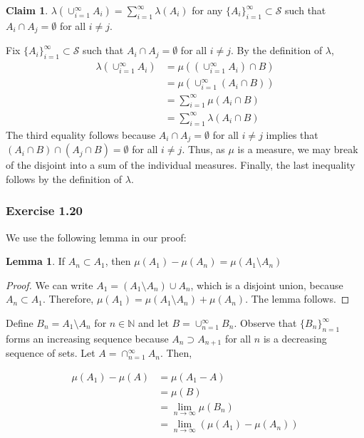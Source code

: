 \documentclass[letterpaper,12pt]{article}
\theoremstyle{definition}
\newtheorem{claim}[theorem]{Claim}
\newtheorem{lemma}[theorem]{Lemma}
\begin{document}
\begin{claim}
  $\lambda(\cup_{i=1}^{\infty} A_i) = \sum_{i = 1}^{\infty} \lambda(A_i)$ for any $\{A_i\}_{i=1}^{\infty} \subset \mathcal{S}$ such that $A_i \cap A_j = \emptyset$ for all $i \ne j$.
\end{claim}

Fix $\{A_i\}_{i=1}^{\infty} \subset \mathcal{S}$ such that $A_i \cap A_j = \emptyset$ for all $i \ne j$. By the definition of $\lambda$,
\begin{align*}
  \lambda(\cup_{i=1}^{\infty} A_i) &= \mu((\cup_{i=1}^{\infty} A_i) \cap B) \\
  &= \mu(\cup_{i=1}^{\infty} (A_i \cap B)) \\
  &= \sum_{i=1}^{\infty} \mu(A_i \cap B) \\
  &= \sum_{i=1}^{\infty} \lambda(A_i \cap B)
\end{align*}
The third equality follows because $A_i \cap A_j = \emptyset$ for all $i \ne j$ implies that $(A_i \cap B) \cap (A_j \cap B) = \emptyset$ for all $i \ne  j$. Thus, as $\mu$ is a measure, we may break of the disjoint into a sum of the individual measures. Finally, the last inequality follows by the definition of $\lambda$.

\subsubsection*{Exercise 1.20}
We use the following lemma in our proof:
\begin{lemma}
  If $A_n \subset A_1$, then $\mu(A_1) - \mu(A_n) = \mu(A_1 \setminus A_n)$
\end{lemma}
\begin{proof}
    We can write $A_1 = (A_1 \setminus A_n) \cup A_n$, which is a disjoint union, because $A_n \subset A_1$. Therefore, $\mu(A_1) = \mu(A_1 \setminus A_n) + \mu(A_n)$. The lemma follows.
\end{proof}

Define $B_n = A_1 \setminus A_n$ for $n \in \mathbb{N}$ and let $B = \cup_{n=1}^{\infty} B_n$. Observe that $\{B_n\}_{n=1}^{\infty}$ forms an increasing sequence because $A_n \supset A_{n+1}$ for all $n$ is a decreasing sequence of sets. Let $A = \cap_{n=1}^{\infty} A_n$. Then,

\begin{align*}
  \mu(A_1) - \mu(A) &= \mu(A_1 - A) \tag{by the above lemma}\\
  &= \mu(B) \tag{by the definition of $B$} \\
  &= \lim_{n \rightarrow \infty} \mu(B_n) \tag{by part (i) of the theorem} \\
  &= \lim_{n \rightarrow \infty} (\mu(A_1) - \mu(A_n)) \tag{by the definition of $B_n$}
\end{align*}
\end{document}
